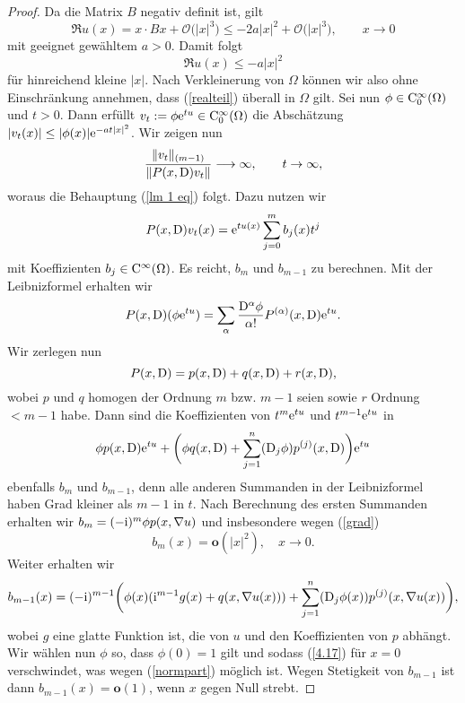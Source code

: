 \begin{proof}
Da die Matrix $B$ negativ definit ist, gilt
\begin{equation}
\Re u(x) = x\cdot Bx + \mathcal O\big(|x|^3\big) \le - 2 a |x|^2 + \mathcal O\big(|x|^3\big),\qquad x\to0
\end{equation}
mit geeignet gewähltem $a>0$. Damit folgt
\begin{equation}
\label{realteil}
\Re u(x) \le - a |x|^2 
\end{equation}
für hinreichend kleine $|x|$. Nach Verkleinerung von $\Omega$ können wir also ohne Einschränkung annehmen, dass (\ref{realteil}) überall in $\Omega$ gilt. 
%
Sei nun $\phi \in \mathrm C_0^\infty(\Omega)$ und $t>0$. Dann erfüllt $v_t := \phi \mathrm e^{tu} \in \mathrm C_0^\infty(\Omega)$ die Abschätzung $|v_t(x)| \le |\phi(x)| \mathrm e^{-at|x|^2}$. Wir zeigen nun
\begin{equation}
\frac{\lVert v_t \rVert_{(m-1)}}{\lVert P(x,\mathrm D)v_t \rVert} \longrightarrow \infty, \qquad t \rightarrow \infty,
\end{equation}
woraus die Behauptung (\ref{lm 1 eq}) folgt. Dazu nutzen wir
\begin{equation}
P(x,\mathrm D)v_t(x) = \mathrm e^{tu(x)} \sum_{j=0}^{m} b_j(x) t^j
\end{equation}
mit Koeffizienten $b_j\in\mathrm C^\infty(\Omega)$. Es reicht, $b_m$ und $b_{m-1}$ zu berechnen. Mit der Leibnizformel erhalten wir
\begin{equation}
P(x,\mathrm D)(\phi \mathrm e^{tu}) = \sum_{\alpha} \dfrac{\mathrm D^\alpha \phi}{\alpha!} P^{(\alpha)}(x,\mathrm D)\mathrm e^{tu}.
\end{equation}
Wir zerlegen nun
\begin{equation}
P(x,\mathrm D) = p(x,\mathrm D) + q(x,\mathrm D) + r(x,\mathrm D),
\end{equation}
wobei $p$ und $q$ homogen der Ordnung $m$ bzw. $m-1$ seien sowie $r$ Ordnung $<m-1$ habe. Dann sind die Koeffizienten von $t^m \mathrm e^{tu}$ und $t^{m-1} \mathrm e^{tu}$ in
\begin{equation}
\phi p(x,\mathrm D)\mathrm e^{tu} + \bigg( \phi q(x,\mathrm D) + \sum_{j=1}^{n} (\mathrm D_j \phi) p^{(j)}(x,\mathrm D) \bigg) \mathrm e^{tu}
\end{equation}
ebenfalls $b_m$ und $b_{m-1}$, denn alle anderen Summanden in der Leibnizformel haben Grad kleiner als $m-1$ in $t$. Nach Berechnung des ersten Summanden erhalten wir $b_m = (-\mathrm i)^m \phi p(x,\nabla u)$ und insbesondere wegen (\ref{grad})
\begin{equation}
b_m(x) = \mathbf{o} (|x|^2), \quad x \rightarrow 0.
\end{equation}
Weiter erhalten wir
\begin{equation}
	\label{4.17}
b_{m-1}(x) = (-\mathrm i)^{m-1} \bigg( \phi(x) (\mathrm i^{m-1}g(x) + q(x,\nabla u(x))) + \sum_{j=1}^{n} (\mathrm D_j \phi(x)) p^{(j)} (x,\nabla u(x)) \bigg),
\end{equation}
wobei $g$ eine glatte Funktion ist, die von $u$ und den Koeffizienten von $p$ abhängt. Wir wählen nun $\phi$ so, dass $\phi(0) =1$ gilt und sodass (\ref{4.17}) für $x=0$ verschwindet, was wegen (\ref{normpart}) möglich ist. Wegen Stetigkeit von $b_{m-1}$ ist dann $b_{m-1}(x) = \mathbf{o}(1)$, wenn $x$ gegen Null strebt.


\end{proof}
